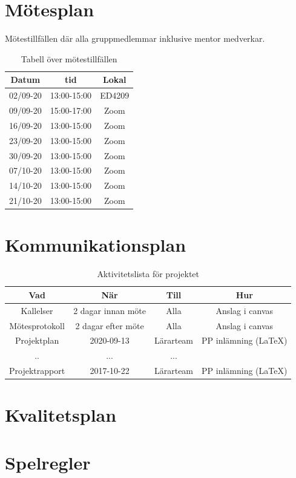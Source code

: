 \documentclass[a4paper]{article}
\begin{document}
\section{Mötesplan}

Mötestillfällen där alla gruppmedlemmar inklusive mentor medverkar.

\begin{table}[H]
    \begin{center}
        \begin{tabular}{ |c|c|c| }\hline
            Datum & tid & Lokal \\\hline\hline
            02/09-20 & 13:00-15:00 & ED4209 \\\hline
            09/09-20 & 15:00-17:00 & Zoom \\\hline
            16/09-20 & 13:00-15:00 & Zoom \\\hline
            23/09-20 & 13:00-15:00 & Zoom \\\hline
            30/09-20 & 13:00-15:00 & Zoom \\\hline
            07/10-20 & 13:00-15:00 & Zoom \\\hline
            14/10-20 & 13:00-15:00 & Zoom \\\hline
            21/10-20 & 13:00-15:00 & Zoom \\\hline
        \end{tabular}
        \caption{Tabell över mötestillfällen}
        \label{table:motesplan}
    \end{center}
\end{table}

\section{Kommunikationsplan}
\begin{table}
    \begin{center}
    \begin{tabular}{ |c|c|c|c| }
     \hline
     Vad & När & Till & Hur \\
     \hline
     \hline
     Kallelser & 2 dagar innan möte & Alla & Anslag i canvas\\
     \hline
     Mötesprotokoll & 2 dagar efter möte & Alla & Anslag i canvas \\
     \hline
     Projektplan & 2020-09-13 & Lärarteam & PP inlämning (LaTeX) \\
     \hline
     .. & ... & ... &  \\
     \hline
     Projektrapport & 2017-10-22 & Lärarteam & PP inlämning (LaTeX) \\
     \hline
    \end{tabular}
    \caption{Aktivitetslista för projektet}
    \label{tabellnamnförreferens}
    \end{center}
    \end{table}

\section{Kvalitetsplan}

\section{Spelregler}



\end{document}
